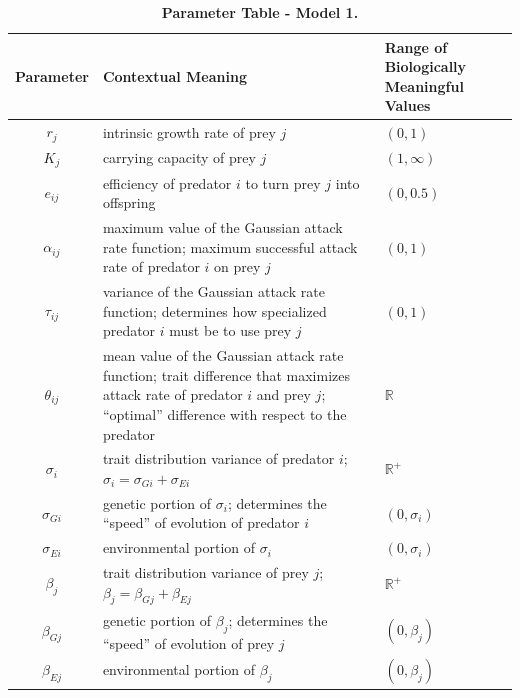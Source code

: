 \documentclass{amsart}
\theoremstyle{definition}
\theoremstyle{remark}
\numberwithin{equation}{section}
\begin{document}
\begin{table}[h]
	\label{parameter_table_model_1}
    \begin{tabular}{||c|L{7cm}|L{2.5cm}||}\hline\hline
    {\bf Parameter} & {\bf Contextual Meaning} & {\bf Range of Biologically Meaningful Values} \\\hline\hline
    $r_j$ & intrinsic growth rate of prey $j$ & $(0, 1)$ \\\hline
    $K_j$ & carrying capacity of prey $j$ & $(1, \infty)$ \\\hline\hline
    $e_{ij}$ & efficiency of predator $i$ to turn prey $j$ into offspring & $(0, 0.5)$ \\\hline\hline
    $\alpha_{ij}$ & maximum value of the Gaussian attack rate function; maximum successful attack rate of predator $i$ on prey $j$ & $(0, 1)$ \\\hline
    $\tau_{ij}$   & variance of the Gaussian attack rate function; determines how specialized predator $i$ must be to use prey $j$ & $(0, 1)$ \\\hline
    $\theta_{ij}$ & mean value of the Gaussian attack rate function; trait difference that maximizes attack rate of predator $i$ and prey $j$; ``optimal'' difference with respect to the predator & $\mathbb{R}$ \\\hline\hline
    $\sigma_i$ & trait distribution variance of predator $i$; $\sigma_i = \sigma_{Gi} + \sigma_{Ei}$ & $\mathbb{R}^{+}$ \\\hline
    $\sigma_{Gi}$ & genetic portion of $\sigma_i$; determines the ``speed'' of evolution of predator $i$ & $(0, \sigma_i)$ \\\hline
    $\sigma_{Ei}$ & environmental portion of $\sigma_i$ & $(0, \sigma_i)$ \\\hline\hline
    $\beta_j$ & trait distribution variance of prey $j$; $\beta_j = \beta_{Gj} + \beta_{Ej}$ & $\mathbb{R}^{+}$ \\\hline
    $\beta_{Gj}$ & genetic portion of $\beta_j$; determines the ``speed'' of evolution of prey $j$ & $(0, \beta_j)$ \\\hline
    $\beta_{Ej}$ & environmental portion of $\beta_j$ & $(0, \beta_j)$ \\\hline\hline
    \end{tabular}
    \caption{\footnotesize{\bf Parameter Table - Model 1.}}
\end{table}
\end{document}
